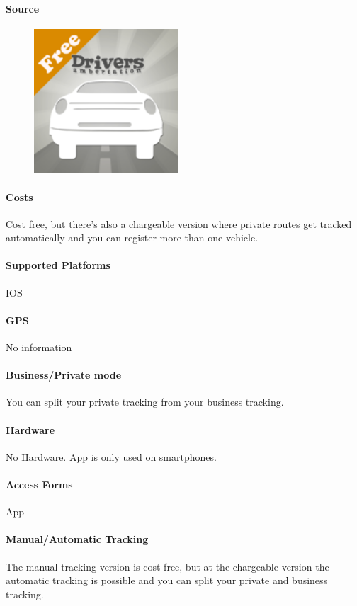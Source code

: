 \paragraph{Source} 
\begin{figure}
  \begin{center}
    \includegraphics[width=0.48\textwidth]{drives}
  \end{center}
\end{figure}
\paragraph{Costs} Cost free, but there's also a chargeable version where private routes get tracked automatically and you can register more than one vehicle.
\paragraph{Supported Platforms} IOS
\paragraph{GPS} No information
\paragraph{Business/Private mode} You can split your private tracking from your business tracking.
\paragraph{Hardware} No Hardware. App is only used on smartphones.
\paragraph{Access Forms} App
\paragraph{Manual/Automatic Tracking} The manual tracking version is cost free, but at the chargeable version the automatic tracking is possible and you can split your private and business tracking.
